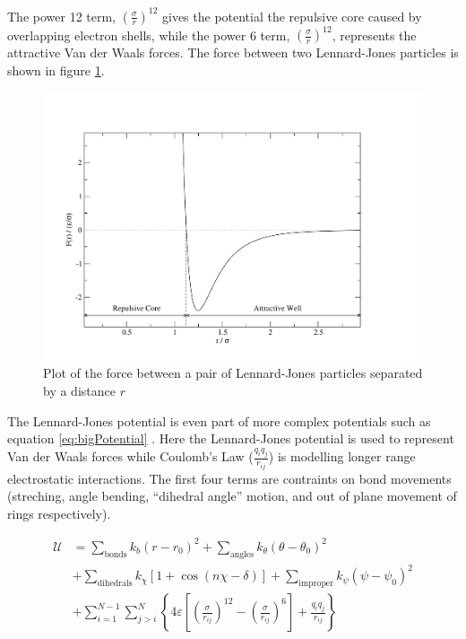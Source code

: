 \message{ !name(main.tex)}\documentclass[12pt]{UoAthesis}
\begin{document}
The power 12 term, $\left(\frac{\sigma}{r}\right)^{12}$ gives the
potential the repulsive core caused by overlapping electron shells,
while the power 6 term, $\left(\frac{\sigma}{r}\right)^{12}$,
represents the attractive Van der Waals forces.  The force between two
Lennard-Jones particles is shown in figure \ref{fig:ljForce}.

\begin{figure}[htp] 
  \begin{center}
    \includegraphics[clip,width=\textwidth]{figures/ljForce} 
    \caption{\label{fig:ljForce} Plot of the force between
      a pair of Lennard-Jones particles separated by a distance $r$}
  \end{center}
\end{figure}

The Lennard-Jones potential is even part of more complex potentials
such as equation \eqref{eq:bigPotential} \cite{Maginn2010}.  Here the
Lennard-Jones potential is used to represent Van der Waals forces while
Coulomb's Law ($\frac{q_iq_j}{r_{ij}}$) is modelling longer range
electrostatic interactions.  The first four terms are contraints on
bond movements (streching, angle bending, ``dihedral angle'' motion,
and out of plane movement of rings respectively).

\begin{align}
  \label{eq:bigPotential}
  \mathcal{U} &= \sum_{\text{bonds}}k_b(r-r_0)^2 
  + \sum_{\text{angles}}k_\theta(\theta - \theta_0)^2 \nonumber\\
  &+ \sum_{\text{dihedrals}} k_\chi[1+\cos(n\chi - \delta)] 
  + \sum_{\text{improper}} k_\psi(\psi - \psi_0)^2 \nonumber\\
  &+ \sum_{i=1}^{N-1}\sum_{j>i}^{N}\left\{ 4 \varepsilon 
    \left[ \left( \frac{\sigma}{r_{ij}} \right)^{12}
      -\left( \frac{\sigma}{r_{ij}} \right)^{6} \right] 
    + \frac{q_iq_j}{r_{ij}}\right\}
\end{align}
\end{document}
